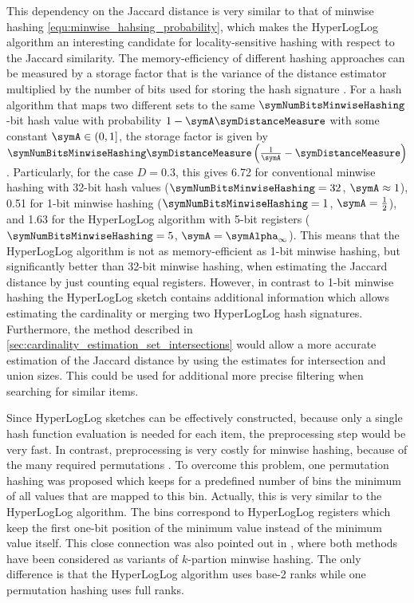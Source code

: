 \documentclass[a4paper]{scrartcl}
\begin{document}
This dependency on the Jaccard distance is very similar to that of minwise hashing \eqref{equ:minwise_hahsing_probability}, which makes the
HyperLogLog algorithm an interesting candidate for locality-sensitive hashing with respect to the Jaccard similarity. The memory-efficiency of different hashing approaches can be measured by a storage factor that is the variance of the distance estimator multiplied by the number of bits used for storing the hash signature \cite{Li2011}. For a hash algorithm that maps two different sets to the same $\symNumBitsMinwiseHashing$-bit hash value with probability $1-\symA\symDistanceMeasure$ with some constant $\symA\in(0,1]$, the storage factor is given by $\symNumBitsMinwiseHashing\symDistanceMeasure\left(\frac{1}{\symA}-\symDistanceMeasure\right)$. 
Particularly, for the case $D=0.3$, this gives \num{6.72} for conventional minwise hashing with 32-bit hash values ($\symNumBitsMinwiseHashing=32$, $\symA\approx 1$), \num{0.51} for 1-bit minwise hashing ($\symNumBitsMinwiseHashing=1$, $\symA=\frac{1}{2}$), and  \num{1.63} for the HyperLogLog algorithm with 5-bit registers ($\symNumBitsMinwiseHashing=5$, $\symA=
\symAlpha_\infty$). This means that the HyperLogLog algorithm is not as memory-efficient as 1-bit minwise hashing, but significantly better than 32-bit minwise hashing, when estimating the Jaccard distance by just counting equal registers. However, in contrast to 1-bit minwise hashing the HyperLogLog sketch contains additional information which allows estimating the cardinality or merging two HyperLogLog hash signatures. Furthermore, the method described in \cref{sec:cardinality_estimation_set_intersections} would allow a more accurate estimation of the Jaccard distance by using the estimates for intersection and union sizes. This could be used for additional more precise filtering when searching for similar items.

Since HyperLogLog sketches can be effectively constructed, because only a single hash function evaluation is needed for each item, the preprocessing step would be very fast. In contrast, preprocessing is very costly for minwise hashing, because of the many required permutations \cite{Li2011}. To overcome this problem, one permutation hashing was proposed \cite{Li2012} which keeps for a predefined number of bins the minimum of all values that are mapped to this bin. Actually, this is very similar to the HyperLogLog algorithm. The bins correspond to HyperLogLog registers which keep the first one-bit position of the minimum value instead of the minimum value itself. This close connection was also pointed out in \cite{Cohen2014}, where both methods have been considered as variants of $k$-partion minwise hashing. The only difference is that the HyperLogLog algorithm uses base-2 ranks while one permutation hashing uses full ranks. 
\end{document}
